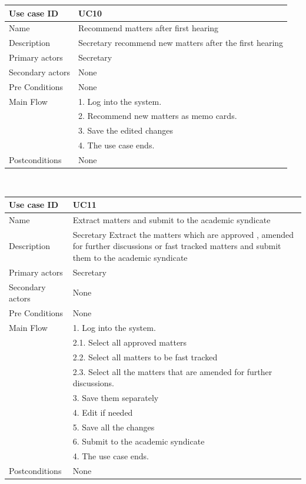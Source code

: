 \documentclass[a4paper,beamer]{article}
\begin{document}
			\begin{tabular}{|p{4cm}|p{8cm}|} \hline 
					\textbf{Use case ID} & \textbf{UC10}  \\ \hline
					Name & Recommend matters after first hearing \\ \hline 
					Description & Secretary recommend new matters after the first hearing \\ \hline 
					Primary actors & Secretary \\ \hline 
					Secondary actors & None \\ \hline 
					Pre Conditions & None \\ \hline
					Main Flow & 1. Log into the system.\\
										& 2. Recommend new matters as memo cards.\\
										& 3. Save the edited changes \\
										& 4. The use case ends.\\ \hline
					Postconditions & None \\ \hline 
			\end{tabular} \\[.6cm]
			
			\begin{tabular}{|p{4cm}|p{8cm}|} \hline 
					\textbf{Use case ID} & \textbf{UC11}  \\ \hline
					Name & Extract matters and submit to the academic syndicate \\ \hline 
					Description & Secretary Extract the matters which are approved , amended for further discussions or fast tracked matters and submit them to the academic syndicate \\ \hline 
					Primary actors & Secretary \\ \hline 
					Secondary actors & None \\ \hline 
					Pre Conditions & None \\ \hline
					Main Flow & 1. Log into the system.\\
							& 2.1. Select all approved matters\\
							& 2.2. Select all matters to be fast tracked\\
							& 2.3. Select all the matters that are amended for further discussions. \\
							& 3. Save them separately\\
							& 4. Edit if needed\\
							& 5. Save all the changes\\
							& 6. Submit to the academic syndicate\\
							& 4. The use case ends.\\ \hline
					Postconditions & None \\ \hline 
			\end{tabular} \\[.6cm]
		
\end{document}

